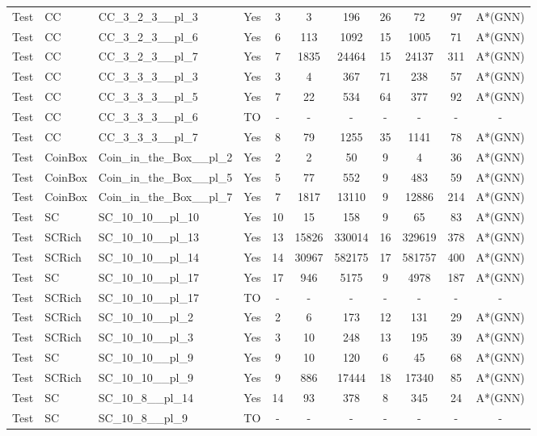 \documentclass{article}
\begin{document}
\begin{tabular}{lllcccccccc}
Test & CC & CC\_3\_2\_3\_\_pl\_3 & Yes & 3 & 3 & 196 & 26 & 72 & 97 & A*(GNN) \\
Test & CC & CC\_3\_2\_3\_\_pl\_6 & Yes & 6 & 113 & 1092 & 15 & 1005 & 71 & A*(GNN) \\
Test & CC & CC\_3\_2\_3\_\_pl\_7 & Yes & 7 & 1835 & 24464 & 15 & 24137 & 311 & A*(GNN) \\
Test & CC & CC\_3\_3\_3\_\_pl\_3 & Yes & 3 & 4 & 367 & 71 & 238 & 57 & A*(GNN) \\
Test & CC & CC\_3\_3\_3\_\_pl\_5 & Yes & 7 & 22 & 534 & 64 & 377 & 92 & A*(GNN) \\
Test & CC & CC\_3\_3\_3\_\_pl\_6 & TO & - & - & - & - & - & - & - \\
Test & CC & CC\_3\_3\_3\_\_pl\_7 & Yes & 8 & 79 & 1255 & 35 & 1141 & 78 & A*(GNN) \\
Test & CoinBox & Coin\_in\_the\_Box\_\_pl\_2 & Yes & 2 & 2 & 50 & 9 & 4 & 36 & A*(GNN) \\
Test & CoinBox & Coin\_in\_the\_Box\_\_pl\_5 & Yes & 5 & 77 & 552 & 9 & 483 & 59 & A*(GNN) \\
Test & CoinBox & Coin\_in\_the\_Box\_\_pl\_7 & Yes & 7 & 1817 & 13110 & 9 & 12886 & 214 & A*(GNN) \\
Test & SC & SC\_10\_10\_\_pl\_10 & Yes & 10 & 15 & 158 & 9 & 65 & 83 & A*(GNN) \\
Test & SCRich & SC\_10\_10\_\_pl\_13 & Yes & 13 & 15826 & 330014 & 16 & 329619 & 378 & A*(GNN) \\
Test & SCRich & SC\_10\_10\_\_pl\_14 & Yes & 14 & 30967 & 582175 & 17 & 581757 & 400 & A*(GNN) \\
Test & SC & SC\_10\_10\_\_pl\_17 & Yes & 17 & 946 & 5175 & 9 & 4978 & 187 & A*(GNN) \\
Test & SCRich & SC\_10\_10\_\_pl\_17 & TO & - & - & - & - & - & - & - \\
Test & SCRich & SC\_10\_10\_\_pl\_2 & Yes & 2 & 6 & 173 & 12 & 131 & 29 & A*(GNN) \\
Test & SCRich & SC\_10\_10\_\_pl\_3 & Yes & 3 & 10 & 248 & 13 & 195 & 39 & A*(GNN) \\
Test & SC & SC\_10\_10\_\_pl\_9 & Yes & 9 & 10 & 120 & 6 & 45 & 68 & A*(GNN) \\
Test & SCRich & SC\_10\_10\_\_pl\_9 & Yes & 9 & 886 & 17444 & 18 & 17340 & 85 & A*(GNN) \\
Test & SC & SC\_10\_8\_\_pl\_14 & Yes & 14 & 93 & 378 & 8 & 345 & 24 & A*(GNN) \\
Test & SC & SC\_10\_8\_\_pl\_9 & TO & - & - & - & - & - & - & - \\

\end{tabular}
\end{document}
